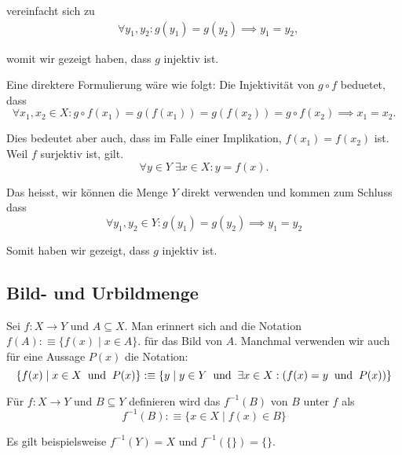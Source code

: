\begin{imp-ex}
\begin{enumerate}[label=(\roman*)]
{      vereinfacht sich zu 
      \begin{equation}
        \begin{aligned}
          &\forall y_1,y_2: g(y_1) = g(y_2) \implies y_1=y_2,
        \end{aligned}
      \end{equation}
      
      womit wir gezeigt haben, dass $g$ injektiv ist.
      
      Eine direktere Formulierung wäre wie folgt: Die Injektivität von $g \circ f$ beduetet, dass  
      \begin{equation}
        \forall x_1, x_2 \in X:
        g \circ f (x_1) = g (f(x_1)) = g(f(x_2)) = g \circ f(x_2) \implies x_1 = x_2.
      \end{equation}
      
      Dies bedeutet aber auch, dass im Falle einer Implikation, $f(x_1) = f(x_2)$ ist. Weil $f$ surjektiv ist, gilt. \begin{equation}
        \forall y \in Y \; \exists x \in X: y = f(x).
      \end{equation}
      
      Das heisst, wir können die Menge $Y$ direkt verwenden und kommen zum Schluss dass
      \begin{equation}
        \forall y_1, y_2 \in Y: g(y_1) = g(y_2) \implies y_1 = y_2
      \end{equation} 
      
      Somit haben wir gezeigt, dass $g$ injektiv ist.
    } 
  \end{enumerate}
\end{imp-ex}

\subsection{Bild- und Urbildmenge}
Sei $f: X \to Y$ und $A \subseteq X$. Man erinnert sich and die Notation $f(A) :\equiv \{f(x) \mid x \in A\}.$ für das Bild von $A$. Manchmal verwenden wir auch für eine Aussage $P(x)$ die Notation:
\begin{equation}
  \{ f(x) \mid x \in X \;\; \text{und}\;\; P(x) \} : \equiv
  \left \{ y \mid y \in Y \;\; \text{und}\;\; \exists x \in X : \left(f(x) = y \;\; \text{und}\;\; P(x) \right) \right \}
\end{equation}

\begin{mydef} 
  Für $f:X \to Y$ und $B \subseteq Y$ definieren wird das  $f^{-1} (B)$ von $B$ unter $f$ als 
  \begin{equation}
    f^{-1} (B) :\equiv \{ x \in X \mid f(x) \in B \}
  \end{equation}
  
  Es gilt beispielsweise $f^{-1} (Y) = X$ und $f^{-1}( \{\})= \{\}$.
\end{mydef}

